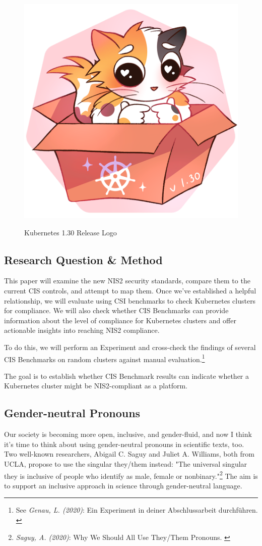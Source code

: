 \begin{figure}[H]
\centering
\caption {Kubernetes 1.30 Release Logo}
\includegraphics[width=0.3\linewidth]{images/k8s-1.30.png}
\label{fig:uwubernetes}
\end{figure}


\subsection{Research Question \& Method}

This paper will examine the new NIS2 security standards, compare them to the current CIS controls, and attempt to map them. Once we've established a helpful relationship, we will evaluate using CSI benchmarks to check Kubernetes clusters for compliance. We will also check whether CIS Benchmarks can provide information about the level of compliance for Kubernetes clusters and offer actionable insights into reaching NIS2 compliance.

To do this, we will perform an Experiment and cross-check the findings of several CIS Benchmarks on random clusters against manual evaluation.\footnote{See \textit{Genau, L. (2020)}: Ein Experiment in deiner Abschlussarbeit durchführen. \cite{expScribbr}}

The goal is to establish whether CIS Benchmark results can indicate whether a Kubernetes cluster might be NIS2-compliant as a platform.

\subsection{Gender-neutral Pronouns}

Our society is becoming more open, inclusive, and gender-fluid, and now I think it's time to think about using gender-neutral pronouns in scientific texts, too. Two well-known researchers, Abigail C. Saguy and Juliet A. Williams, both from UCLA, propose to use the singular they/them instead: "The universal singular they is inclusive of people who identify as male, female or nonbinary."\footnote{\textit{Saguy, A. (2020)}: Why We Should All Use They/Them Pronouns. \cite{pronouns}} The aim is to support an inclusive approach in science through gender-neutral language. 

